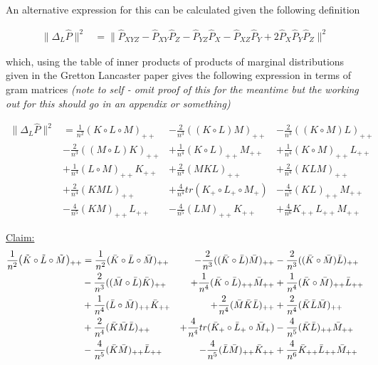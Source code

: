 \documentclass{article}
\newenvironment{claim}[1]{\par\noindent\underline{Claim:}\space#1}{}
\begin{document}
An alternative expression for this can be calculated given the following definition

\begin{align*}
\|\Delta_L \hat{P}\|^2 & = \|\hat{P}_{XYZ}-\hat{P}_{XY}\hat{P}_{Z} -\hat{P}_{YZ}\hat{P}_{X} - \hat{P}_{XZ}\hat{P}_{Y} + 2\hat{P}_X\hat{P}_Y\hat{P}_Z \|^2 
\end{align*}

which, using the table of inner products of products of marginal distributions given in the Gretton Lancaster paper gives the following expression in terms of gram matrices \emph{(note to self - omit proof of this for the meantime but the working out for this should go in an appendix or something)}

\begin{align*}
\|\Delta_L \hat{P}\|^2 &= \frac{1}{n^2}(K \circ L\circ M)_{++} &-
\frac{2}{n^3}((K\circ L) M)_{++} & - 
\frac{2}{n^3}((K \circ M) L)_{++} \\&- 
\frac{2}{n^3}((M \circ L) K)_{++} &+ 
\frac{1}{n^4}(K \circ L)_{++} M_{++} &+ 
\frac{1}{n^4}(K \circ M)_{++} L_{++} \\&+ 
\frac{1}{n^4}(L \circ M)_{++} K_{++} &+ 
\frac{2}{n^4}(MKL)_{++} &+ 
\frac{2}{n^4}(KLM)_{++} \\&+ 
\frac{2}{n^4}(KML)_{++} &+ 
\frac{4}{n^4}tr(K_+ \circ L_+ \circ M_+) &-
\frac{4}{n^5}(K L)_{++} M_{++} \\& - 
\frac{4}{n^5}(KM)_{++}L_{++} &- 
\frac{4}{n^5}(LM)_{++} K_{++} &+
\frac{4}{n^6}K_{++} L_{++} M_{++}
\end{align*}

\begin{claim}
\begin{align*}
\frac{1}{n^2}\mathlarger{(}\tilde{K}\circ\tilde{L}\circ\tilde{M}\mathlarger{)}_{++} &= \frac{1}{n^2}(\bar{K} \circ \bar{L}\circ \bar{M})_{++} &-
\frac{2}{n^3}((\bar{K}\circ \bar{L}) \bar{M})_{++} & - 
\frac{2}{n^3}((\bar{K} \circ \bar{M}) \bar{L})_{++} \\&- 
\frac{2}{n^3}((\bar{M} \circ \bar{L}) \bar{K})_{++} &+ 
\frac{1}{n^4}(\bar{K} \circ \bar{L})_{++} \bar{M}_{++} &+ 
\frac{1}{n^4}(\bar{K} \circ \bar{M})_{++} \bar{L}_{++} \\&+ 
\frac{1}{n^4}(\bar{L} \circ \bar{M})_{++} \bar{K}_{++} &+ 
\frac{2}{n^4}(\bar{M}\bar{K}\bar{L})_{++} &+ 
\frac{2}{n^4}(\bar{K}\bar{L}\bar{M})_{++} \\&+ 
\frac{2}{n^4}(\bar{K}\bar{M}\bar{L})_{++} &+ 
\frac{4}{n^4}tr(\bar{K}_+ \circ \bar{L}_+ \circ \bar{M}_+) &-
\frac{4}{n^5}(\bar{K} \bar{L})_{++} \bar{M}_{++} \\& - 
\frac{4}{n^5}(\bar{K}\bar{M})_{++}\bar{L}_{++} &- 
\frac{4}{n^5}(\bar{L}\bar{M})_{++} \bar{K}_{++} &+
\frac{4}{n^6}\bar{K}_{++} \bar{L}_{++} \bar{M}_{++}
\end{align*}
\end{claim}
\end{document}
